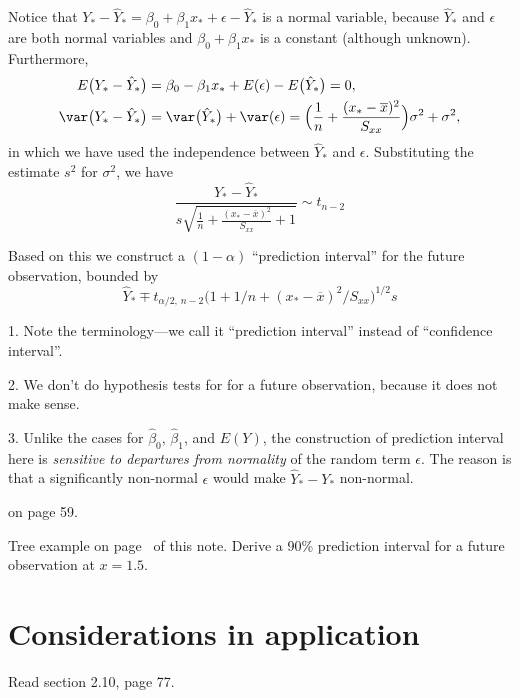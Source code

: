 \documentclass[12pt]{article}
\begin{document}
Notice that
$Y_* - \hat{Y}_* = \beta_0 + \beta_1 x_* + \epsilon - \hat{Y}_*$
is a normal variable, because
$\hat{Y}_*$ and $\epsilon$ are both normal variables and
$\beta_0 + \beta_1 x_*$ is a constant (although unknown).
Furthermore,
\begin{align*}
E\bigl(Y_* - \hat{Y}_*\bigr)
&= \beta_0 - \beta_1 x_* + E(\epsilon) - E\bigl(\hat{Y}_*\bigr) = 0
,
\\
\var\bigl(Y_* - \hat{Y}_*\bigr)
&= \var\bigl(\hat{Y}_*\bigr) + \var(\epsilon)
 = \Bigl(\frac{1}{n} + \frac{(x_* - \overline{x})^2}{S_{xx}}\Bigr)
    \sigma^2 + \sigma^2
,
\end{align*}
in which we have used the independence between $\hat{Y}_*$ and
$\epsilon$.
Substituting the estimate $s^2$ for $\sigma^2$, we have
\[
\frac{Y_* - \hat{Y}_*}{s\sqrt{\frac{1}{n} + \frac{(x_* - \overline{x})^2}{S_{xx}} + 1}}
\sim t_{n-2}
\]

Based on this we construct a $(1 - \alpha)$ ``prediction interval''
for the future observation, bounded by
\[
\hat{Y}_* \mp t_{\alpha/2,\, n-2}
    \bigl(1 + 1/n + (x_* - \overline{x})^2/S_{xx}\big)^{1/2} s
\]



\alert
1. Note the terminology---we call it ``prediction interval'' instead of
``confidence interval''.

2. We don't do hypothesis tests for for a future observation,
because it does not make sense.

3.
Unlike the cases for $\hat{\beta}_0$, $\hat{\beta}_1$, and $E(Y)$,
the construction of prediction interval here is
\emph{sensitive to departures from normality} of the random term
$\epsilon$.
The reason is that a significantly non-normal $\epsilon$
would make $\hat{Y}_* - Y_*$ non-normal.

\example on page 59.

\example Tree example on page~\pageref{ex:tree} of this note.
Derive a 90\% prediction interval for
a future observation at $x = 1.5$.

\section{Considerations in application}

Read section 2.10, page 77.
\end{document}
